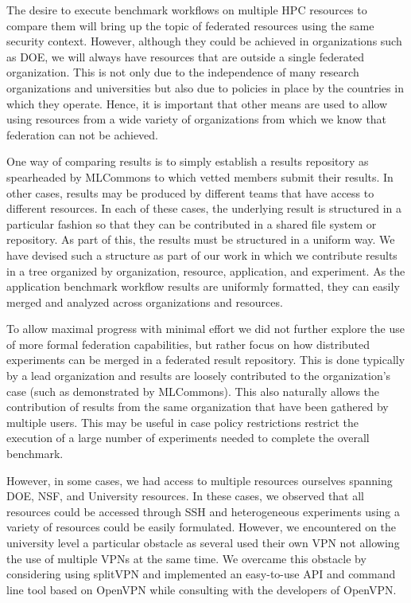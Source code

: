 \documentclass[utf8]{FrontiersinVancouver} %
\begin{document}
The desire to execute benchmark workflows on multiple HPC resources to compare them will bring up the topic of federated resources using the same security context. However, although they could be achieved in organizations such as DOE, we will always have resources that are outside a single federated organization. This is not only due to the independence of many research organizations and universities but also due to policies in place by the countries in which they operate. Hence, it is important that other means are used to allow using resources from a wide variety of organizations from which we know that federation can not be achieved.

One way of comparing results is to simply establish a results repository as spearheaded by MLCommons to which vetted members submit their results. In other cases, results may be produced by different teams that have access to different resources. In each of these cases, the underlying result is structured in a particular fashion so that they can be contributed in a shared file system or repository. As part of this, the results must be structured in a uniform way. We have devised such a structure as part of our work in which we contribute results in a tree organized by organization, resource, application, and experiment. As the application benchmark workflow results are uniformly formatted, they can easily merged and analyzed across organizations and resources. 

To allow maximal progress with minimal effort we did not further explore the use of more formal federation capabilities, but rather focus on how distributed experiments can be merged in a federated result repository. This is done typically by a lead organization and results are loosely contributed to the organization's case (such as demonstrated by MLCommons). This also naturally allows the contribution of results from the same organization that have been gathered by multiple users. This may be useful in case policy restrictions restrict the execution of a large number of experiments needed to complete the overall benchmark.

However, in some cases, we had access to multiple resources ourselves spanning DOE, NSF, and University resources. In these cases, we observed that all resources could be accessed through SSH and heterogeneous experiments using a variety of resources could be easily formulated. However, we encountered on the university level a particular obstacle as several used their own VPN not allowing the use of multiple VPNs at the same time. We overcame this obstacle by considering using splitVPN and implemented an easy-to-use API and command line tool based on OpenVPN while consulting with the developers of OpenVPN. 
\end{document}
